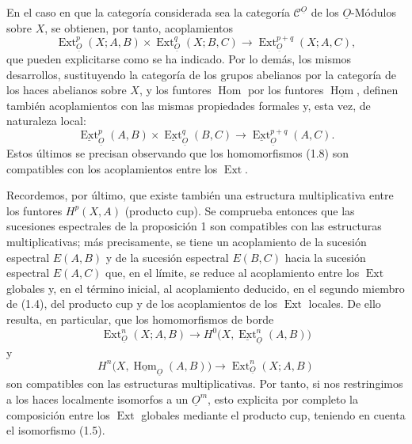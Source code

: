 \documentclass[11pt,twoside,openany]{book}
\numberwithin{equation}{section}
\newcommand{\src}[1]{%
  \phantomsection\hypertarget{src:#1}{}%
  \marginpar{\raggedleft\footnotesize\sffamily #1}%
}
\newcommand{\Osh}{\underline{O}}
\newcommand{\Ccat}{\mathcal C}
\newcommand{\Homsh}{\underline{\operatorname{Hom}}}
\newcommand{\Extsh}{\underline{\operatorname{Ext}}}
\newcommand{\fquote}[1]{\textquotedbl#1\textquotedbl}
\theoremstyle{plain}
\theoremstyle{definition}
\theoremstyle{remark}
\newcommand{\FgaUnitKey}{frontmatter}
\renewcommand{\src}[1]{%
  \phantomsection\hypertarget{src:\FgaUnitKey:#1}{}%
  \marginpar{\raggedleft\footnotesize\sffamily #1}%
}
\theoremstyle{plain}
\theoremstyle{definition}
\theoremstyle{remark}
\begin{document}
En el caso en que la categoría considerada sea la categoría $\Ccat^{\Osh}$ de los
$\Osh$-Módulos sobre $X$, se obtienen, por tanto, acoplamientos
\begin{equation}\tag{2.4}
  \operatorname{Ext}_{\Osh}^{p}(X;A,B)
  \times\operatorname{Ext}_{\Osh}^{q}(X;B,C)
  \longrightarrow\operatorname{Ext}_{\Osh}^{p+q}(X;A,C),
\end{equation}
que pueden explicitarse como se ha indicado. Por lo demás, los mismos
desarrollos, sustituyendo la categoría de los grupos abelianos por la
categoría de los haces abelianos sobre $X$, y los funtores $\operatorname{Hom}$
por los funtores $\Homsh$, definen también acoplamientos con las mismas
propiedades formales y, esta vez, de \fquote{naturaleza local}:
\begin{equation}\tag{2.5}
  \Extsh_{\Osh}^{p}(A,B)\times\Extsh_{\Osh}^{q}(B,C)
  \longrightarrow\Extsh_{\Osh}^{p+q}(A,C).
\end{equation}
Estos últimos se precisan observando que los homomorfismos (1.8) son
compatibles con los acoplamientos entre los $\operatorname{Ext}$.

\src{173}
Recordemos, por último, que existe también una estructura multiplicativa entre los funtores
$H^{p}(X,A)$ (producto cup). Se comprueba entonces que las sucesiones espectrales de la
proposición 1 son compatibles con las estructuras multiplicativas; más
precisamente, se tiene un acoplamiento de la sucesión espectral $E(A,B)$ y de la sucesión
espectral $E(B,C)$ hacia la sucesión espectral $E(A,C)$ que, en el límite,
se reduce al acoplamiento entre los $\operatorname{Ext}$ globales y, en el
término inicial, al acoplamiento deducido, en el segundo miembro de (1.4), del
producto cup y de los acoplamientos de los $\operatorname{Ext}$ locales. De ello resulta,
en particular, que los \fquote{homomorfismos de borde}
\begin{equation}\tag{2.6}
  \operatorname{Ext}_{\Osh}^{n}(X;A,B)
  \longrightarrow H^{0}\bigl(X,\Extsh_{\Osh}^{n}(A,B)\bigr)
\end{equation}
y
\begin{equation}\tag{2.7}
  H^{n}\bigl(X,\Homsh_{\Osh}(A,B)\bigr)
  \longrightarrow\operatorname{Ext}_{\Osh}^{n}(X;A,B)
\end{equation}
son compatibles con las estructuras multiplicativas. Por tanto, si nos restringimos a los
haces localmente isomorfos a un $\Osh^{m}$, esto explicita por completo la
composición entre los $\operatorname{Ext}$ globales mediante el producto cup, teniendo
en cuenta el isomorfismo (1.5).
\end{document}
